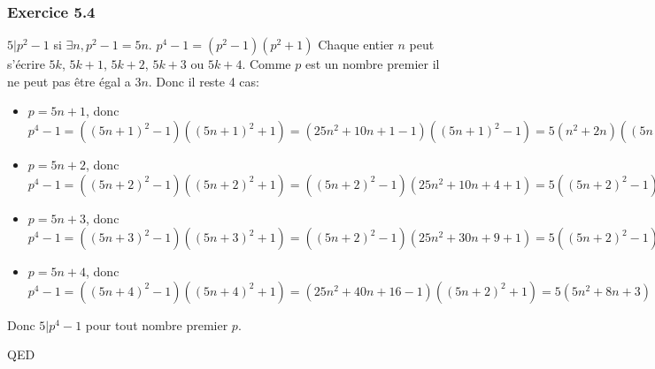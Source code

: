 \documentclass[]{book}
\theoremstyle{definition}
\begin{document}
\subsubsection*{Exercice 5.4}
$5 | p^2-1$ si $\exists n, p^2-1 = 5n$. 
$p^4 -1 = (p^2-1)(p^2+1)$
Chaque entier $n$ peut s'\'ecrire $5k$, $5k+1$, $5k+2$, $5k+3$ ou $5k+4$. Comme $p$ est un nombre premier il ne peut pas \^etre \'egal a $3n$. Donc il reste 4 cas:
\begin{itemize}
\item $p = 5n+1$, donc $p^4-1 = ((5n+1)^2-1)((5n+1)^2+1) = (25n^2+10n+1-1)((5n+1)^2-1) = 5(n^2+2n)((5n+1)^2-1)$
\item $p = 5n+2$, donc $p^4-1 = ((5n+2)^2-1)((5n+2)^2+1) = ((5n+2)^2-1)(25n^2+10n+4+1) = 5((5n+2)^2-1)(5n^2+2n+1)$
\item $p = 5n+3$, donc $p^4-1 = ((5n+3)^2-1)((5n+3)^2+1) = ((5n+2)^2-1)(25n^2+30n+9+1) = 5((5n+2)^2-1)(5n^2+6n+2)$
\item $p = 5n+4$, donc $p^4-1 = ((5n+4)^2-1)((5n+4)^2+1) = (25n^2+40n+16-1)((5n+2)^2+1) = 5(5n^2+8n+3)((5n+2)^2-1)$
\end{itemize}
Donc $5|p^4 -1$ pour tout nombre premier $p$.

 




QED
\end{document}

